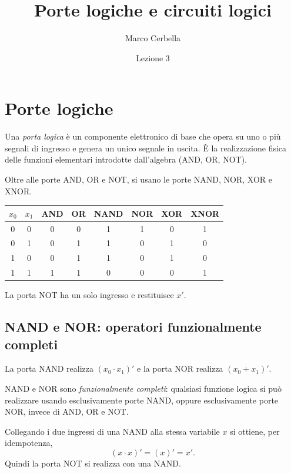 \documentclass[11pt,a4paper]{article}
\title{Porte logiche e circuiti logici}
\author{Marco Cerbella}
\date{Lezione 3}
\begin{document}
\maketitle

\section{Porte logiche}

\begin{definizione}
Una \emph{porta logica} è un componente elettronico di base che opera su uno o più segnali di ingresso e genera un unico segnale in uscita. È la realizzazione fisica delle funzioni elementari introdotte dall'algebra (AND, OR, NOT).
\end{definizione}

Oltre alle porte AND, OR e NOT, si usano le porte NAND, NOR, XOR e XNOR.

\begin{center}
\begin{tabular}{cc|cccccc}
\toprule
$x_0$ & $x_1$ & AND & OR & NAND & NOR & XOR & XNOR \\
\midrule
0 & 0 & 0 & 0 & 1 & 1 & 0 & 1 \\
0 & 1 & 0 & 1 & 1 & 0 & 1 & 0 \\
1 & 0 & 0 & 1 & 1 & 0 & 1 & 0 \\
1 & 1 & 1 & 1 & 0 & 0 & 0 & 1 \\
\bottomrule
\end{tabular}
\end{center}

La porta NOT ha un solo ingresso e restituisce $x'$.

\subsection{NAND e NOR: operatori funzionalmente completi}

La porta NAND realizza $(x_0 \cdot x_1)'$ e la porta NOR realizza $(x_0 + x_1)'$.

\begin{proposizione}
NAND e NOR sono \emph{funzionalmente completi}: qualsiasi funzione logica si può realizzare usando esclusivamente porte NAND, oppure esclusivamente porte NOR, invece di AND, OR e NOT.
\end{proposizione}

\begin{esempio}
Collegando i due ingressi di una NAND alla stessa variabile $x$ si ottiene, per idempotenza,
\[
(x \cdot x)' = (x)' = x'.
\]
Quindi la porta NOT si realizza con una NAND.
\end{esempio}
\end{document}
